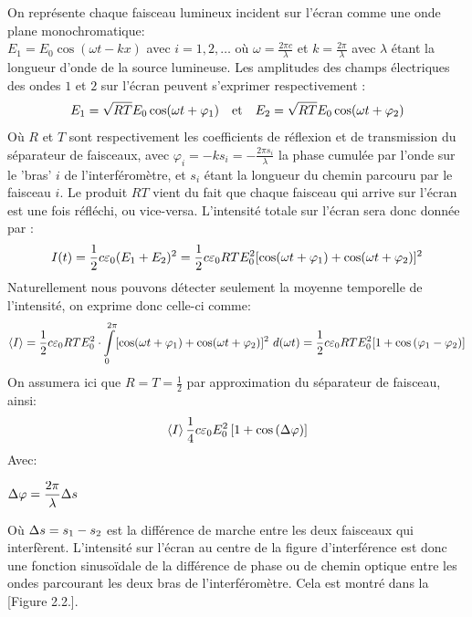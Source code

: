 \documentclass[11pt, openright]{book}
\begin{document}
					On représente chaque faisceau lumineux incident sur l'écran comme une onde plane monochromatique:\\ $E_1=E_0\cos\left(\omega t-kx  \right) $ avec $i=1,2,\ldots$ où $\omega =\frac{2\pi c}{\lambda }$ et $k=\frac{2\pi}{\lambda }$ avec $\lambda $ étant la longueur d'onde de la source lumineuse. Les amplitudes des champs électriques des ondes $1$ et $2$ sur l'écran peuvent s'exprimer respectivement : 
					\begin{equation}
						\displaystyle{E_1=\sqrt{RT} E_0\cos(\omega t + \varphi_1)}\quad\text{et}\quad E_2=\sqrt{RT} E_0\cos(\omega t+\varphi_2)
					\end{equation}	
					Où $R$ et $T$ sont respectivement les coefficients de réflexion et de transmission du séparateur de faisceaux, avec $\varphi_i = -ks_i = -\frac{2\pi s_i}{\lambda }$ la phase cumulée par l'onde sur le 'bras' $i$ de l'interféromètre, et $s_i$ étant la longueur du chemin parcouru par le faisceau $i$. Le produit $RT$ vient du fait que chaque faisceau qui arrive sur l'écran est une fois réfléchi, ou vice-versa. L'intensité totale sur l'écran sera donc donnée par : 
					\begin{equation}
						\displaystyle{I(t)=\frac{1}{2}c\varepsilon_0(E_1+E_2)^{2}=\frac{1}{2}c\varepsilon_0RTE_{0}^{2}[\cos(\omega t +\varphi_1)+\cos(\omega t+\varphi_2)]^{2}}
					\end{equation}
					Naturellement nous pouvons détecter seulement la moyenne temporelle de l'intensité, on exprime donc celle-ci comme: 
					\begin{equation}
						\displaystyle{\langle I\rangle} = \frac{1}{2}c\varepsilon_0RTE_{0}^{2}\cdot \int\limits_{0}^{2\pi} [\cos(\omega t+\varphi_1)+\cos(\omega t+\varphi_2)]^{2} \  d (\omega t) = \frac{1}{2}c\varepsilon_0RTE_{0}^{2}[1+\cos\left(\varphi_1-\varphi_2  \right) ]
					\end{equation}
					On assumera ici que $R=T=\frac{1}{2}$ par approximation du séparateur de faisceau, ainsi: 
					\begin{equation}
						\displaystyle{\left<I \right> \frac{1}{4}}c\varepsilon_0E_{0}^{2} \left[ 1+\cos\left(\Delta\varphi  \right)  \right]  		
					\end{equation}
										Avec: \\\vspace{2mm}
					\centerline{$\displaystyle{\Delta\varphi=\frac{2\pi}{\lambda}\Delta s}$}
					Où $\displaystyle{\Delta s = s_1-s_2}$ est la différence de marche entre les deux faisceaux qui interfèrent. L'intensité sur l'écran au centre de la figure d'interférence est donc une fonction sinusoïdale de la différence de phase ou de chemin optique entre les ondes parcourant les deux bras de l'interféromètre. Cela est montré dans la [Figure 2.2.]. 
\end{document}
